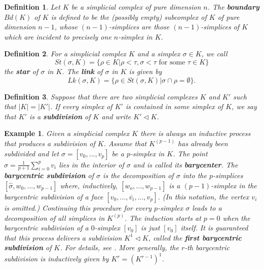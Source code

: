 \documentclass[11pt]{book}
\newtheorem{definition}{Definition}
\newtheorem{example}{Example}
\begin{document}
\begin{definition}
Let $K$ be a simplicial complex of pure dimension $n$. The \textbf{boundary} $Bd(K)$ of $K$ is defined to be the (possibly empty) subcomplex of $K$ of pure dimension $n-1$, whose $(n-1)$-simplices are those $(n-1)$-simplices of $K$ which are incident to precisely one $n$-simplex in $K$.
\end{definition}

\begin{definition}
For a simplicial complex $K$ and a simplex $\sigma \in K$, we call
\begin{equation*}
St(\sigma,K)= \{ \rho \in K | \rho < \tau, \sigma < \tau \text{ for some } \tau \in K \}  
\end{equation*}
the \textbf{star} of $\sigma$ in $K$. The \textbf{link} of $\sigma$ in $K$ is given by
\begin{equation*}
Lk(\sigma,K) = \{ \rho \in St(\sigma,K) | \sigma \cap \rho = \emptyset \}.
\end{equation*}
\end{definition}

\begin{definition}
Suppose that there are two simplicial complexes $K$ and $K'$ such that $|K| = |K'|$. If every simplex of $K'$ is contained in some simplex of $K$, we say that $K'$ is a \textbf{subdivision} of $K$ and write $K' \lhd K$.
\end{definition}


\begin{example}
Given a simplicial complex $K$ there is always an inductive process that produces a subdivision of $K$. Assume that $K^{(p-1)}$ has already been subdivided and let $\sigma=[v_0,...,v_p]$ be a $p$-simplex in $K$. The point $\hat{\sigma}=\frac{1}{p+1} \sum_{i=0}^p v_i$ lies in the interior of $\sigma$ and is called its \textbf{barycenter}. The \textbf{barycentric subdivision} of $\sigma$ is the decomposition of $\sigma$ into the $p$-simplices $[\hat{\sigma},w_0,...,w_{p-1}]$ where, inductively, $[w_o,...,w_{p-1}]$ is a $(p-1)$-simplex in the barycentric subdivision of a face $[v_0,...,\overline{v_i},...,v_p]$. (In this notation, the vertex $v_i$ is omitted.) Continuing this procedure for every $p$-simplex $\sigma$ leads to a decomposition of all simplices in $K^{(p)}$. The induction starts at $p=0$ when the barycentric subdivision of a $0$-simplex $[v_0]$ is just $[v_0]$ itself. It is guaranteed that this process delivers a subdivision $K^1 \lhd K$, called the \textbf{first barycentric subdivision} of $K$. For details, see \cite{hatcher}. More generally, the $r$-th barycentric subdivision is inductively given by $K^r=(K^{r-1})^1$.
\end{example}
\end{document}
